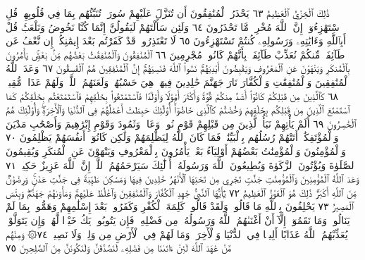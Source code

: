 ذَٰلِكَ ٱلْخِزْيُ ٱلْعَظِيمُ ٦٣ يَحْذَرُ ٱلْمُنَٰفِقُونَ أَن
تُنَزَّلَ عَلَيْهِمْ سُورَةࣱ تُنَبِّئُهُم بِمَا فِي قُلُوبِهِمْۚ قُلِ ٱسْتَهْزِءُوٓا۟
إِنَّ ٱللَّهَ مُخْرِجࣱ مَّا تَحْذَرُونَ ٦٤ وَلَئِن سَأَلْتَهُمْ
لَيَقُولُنَّ إِنَّمَا كُنَّا نَخُوضُ وَنَلْعَبُۚ قُلْ أَبِٱللَّهِ وَءَايَٰتِهِۦ
وَرَسُولِهِۦ كُنتُمْ تَسْتَهْزِءُونَ ٦٥ لَا تَعْتَذِرُوا۟ قَدْ كَفَرْتُم
بَعْدَ إِيمَٰنِكُمْۚ إِن نَّعْفُ عَن طَآئِفَةࣲ مِّنكُمْ نُعَذِّبْ طَآئِفَةَۢ
بِأَنَّهُمْ كَانُوا۟ مُجْرِمِينَ ٦٦ ٱلْمُنَٰفِقُونَ وَٱلْمُنَٰفِقَٰتُ
بَعْضُهُم مِّنۢ بَعْضࣲۚ يَأْمُرُونَ بِٱلْمُنكَرِ وَيَنْهَوْنَ
عَنِ ٱلْمَعْرُوفِ وَيَقْبِضُونَ أَيْدِيَهُمْۚ نَسُوا۟ ٱللَّهَ فَنَسِيَهُمْۚ
إِنَّ ٱلْمُنَٰفِقِينَ هُمُ ٱلْفَٰسِقُونَ ٦٧ وَعَدَ ٱللَّهُ ٱلْمُنَٰفِقِينَ
وَٱلْمُنَٰفِقَٰتِ وَٱلْكُفَّارَ نَارَ جَهَنَّمَ خَٰلِدِينَ فِيهَاۚ هِيَ
حَسْبُهُمْۚ وَلَعَنَهُمُ ٱللَّهُۖ وَلَهُمْ عَذَابࣱ مُّقِيمࣱ ٦٨
كَٱلَّذِينَ مِن قَبْلِكُمْ كَانُوٓا۟ أَشَدَّ مِنكُمْ قُوَّةࣰ وَأَكْثَرَ أَمْوَٰلࣰا
وَأَوْلَٰدࣰا فَٱسْتَمْتَعُوا۟ بِخَلَٰقِهِمْ فَٱسْتَمْتَعْتُم بِخَلَٰقِكُمْ
كَمَا ٱسْتَمْتَعَ ٱلَّذِينَ مِن قَبْلِكُم بِخَلَٰقِهِمْ وَخُضْتُمْ
كَٱلَّذِي خَاضُوٓا۟ۚ أُو۟لَٰٓئِكَ حَبِطَتْ أَعْمَٰلُهُمْ فِي ٱلدُّنْيَا
وَٱلْأٓخِرَةِۖ وَأُو۟لَٰٓئِكَ هُمُ ٱلْخَٰسِرُونَ ٦٩ أَلَمْ يَأْتِهِمْ
نَبَأُ ٱلَّذِينَ مِن قَبْلِهِمْ قَوْمِ نُوحࣲ وَعَادࣲ وَثَمُودَ وَقَوْمِ
إِبْرَٰهِيمَ وَأَصْحَٰبِ مَدْيَنَ وَٱلْمُؤْتَفِكَٰتِۚ أَتَتْهُمْ رُسُلُهُم
بِٱلْبَيِّنَٰتِۖ فَمَا كَانَ ٱللَّهُ لِيَظْلِمَهُمْ وَلَٰكِن كَانُوٓا۟
أَنفُسَهُمْ يَظْلِمُونَ ٧٠ وَٱلْمُؤْمِنُونَ وَٱلْمُؤْمِنَٰتُ بَعْضُهُمْ
أَوْلِيَآءُ بَعْضࣲۚ يَأْمُرُونَ بِٱلْمَعْرُوفِ وَيَنْهَوْنَ عَنِ ٱلْمُنكَرِ
وَيُقِيمُونَ ٱلصَّلَوٰةَ وَيُؤْتُونَ ٱلزَّكَوٰةَ وَيُطِيعُونَ ٱللَّهَ
وَرَسُولَهُۥٓۚ أُو۟لَٰٓئِكَ سَيَرْحَمُهُمُ ٱللَّهُۗ إِنَّ ٱللَّهَ عَزِيزٌ حَكِيمࣱ ٧١
وَعَدَ ٱللَّهُ ٱلْمُؤْمِنِينَ وَٱلْمُؤْمِنَٰتِ جَنَّٰتࣲ تَجْرِي مِن تَحْتِهَا
ٱلْأَنْهَٰرُ خَٰلِدِينَ فِيهَا وَمَسَٰكِنَ طَيِّبَةࣰ فِي جَنَّٰتِ عَدْنࣲۚ
وَرِضْوَٰنࣱ مِّنَ ٱللَّهِ أَكْبَرُۚ ذَٰلِكَ هُوَ ٱلْفَوْزُ ٱلْعَظِيمُ ٧٢
يَٰٓأَيُّهَا ٱلنَّبِيُّ جَٰهِدِ ٱلْكُفَّارَ وَٱلْمُنَٰفِقِينَ وَٱغْلُظْ عَلَيْهِمْۚ
وَمَأْوَىٰهُمْ جَهَنَّمُۖ وَبِئْسَ ٱلْمَصِيرُ ٧٣ يَحْلِفُونَ بِٱللَّهِ مَا قَالُوا۟
وَلَقَدْ قَالُوا۟ كَلِمَةَ ٱلْكُفْرِ وَكَفَرُوا۟ بَعْدَ إِسْلَٰمِهِمْ وَهَمُّوا۟
بِمَا لَمْ يَنَالُوا۟ۚ وَمَا نَقَمُوٓا۟ إِلَّآ أَنْ أَغْنَىٰهُمُ ٱللَّهُ وَرَسُولُهُۥ
مِن فَضْلِهِۦۚ فَإِن يَتُوبُوا۟ يَكُ خَيْرࣰا لَّهُمْۖ وَإِن يَتَوَلَّوْا۟ يُعَذِّبْهُمُ
ٱللَّهُ عَذَابًا أَلِيمࣰا فِي ٱلدُّنْيَا وَٱلْأٓخِرَةِۚ وَمَا لَهُمْ فِي ٱلْأَرْضِ
مِن وَلِيࣲّ وَلَا نَصِيرࣲ ٧٤۞ وَمِنْهُم مَّنْ عَٰهَدَ ٱللَّهَ لَئِنْ ءَاتَىٰنَا
مِن فَضْلِهِۦ لَنَصَّدَّقَنَّ وَلَنَكُونَنَّ مِنَ ٱلصَّٰلِحِينَ ٧٥
